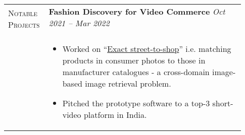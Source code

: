 \documentclass[letterpaper, 10pt, oneside]{article}
\newcommand{\stitle}[1]{\normalsize{\textsc{#1}}}
\newcommand{\bdit}[1]{{\textbf{#1}}}
\begin{document}
\begin{longtable}{@{} p{0.13\linewidth} p{0.8\linewidth}}
    \multirow{2}{6.5em}{\stitle{Notable Projects}}    
    & \bdit{Fashion Discovery for Video Commerce} \hfill \textsl{Oct 2021 -- Mar 2022}                                                                                                                      \\
                                                      &                                                                                                                                                                                                       \\[-4ex]
                                                      & \parbox{0.8\textwidth}{                                                                                                                                                                               %
        \begin{itemize}[leftmargin=*, itemsep=-0.88ex, topsep=1.3ex]
            \item Worked on  ``\href{https://openaccess.thecvf.com/content_iccv_2015/papers/Kiapour_Where_to_Buy_ICCV_2015_paper.pdf}{Exact street-to-shop}''
                  i.e. matching products in consumer photos to those in manufacturer catalogues - a cross-domain image-based image retrieval problem.
            \item Pitched the prototype software to a top-3 short-video platform in India.
        \end{itemize}
    }
    \\



\end{longtable}
\end{document}
